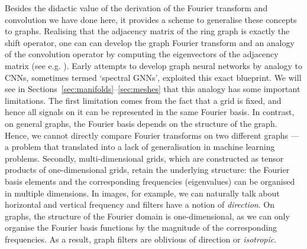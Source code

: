 Besides the didactic value of the derivation of the Fourier transform
and convolution we have done here, it provides a scheme to generalise these concepts to graphs. Realising that the adjacency matrix of the ring graph is exactly the shift operator, one can can develop the graph Fourier transform and an analogy of the convolution operator by computing the eigenvectors of the adjacency matrix (see e.g. \cite{sandryhaila2013discrete}).
%
Early attempts to develop graph neural networks by analogy to CNNs, sometimes termed `spectral GNNs', exploited this exact blueprint. 
%
We will see in %
Sections~\ref{sec:manifolds}--\ref{sec:meshes}
that this analogy has some important limitations. 
%
The first limitation comes from the fact that a grid is fixed, and hence all signals on it can be represented in the same Fourier basis. In contrast, on general graphs, the Fourier basis depends on the structure of the graph. Hence, we cannot directly compare Fourier transforms on two different graphs --- a problem that translated into a lack of generalisation in machine learning problems. 
%
Secondly, multi-dimensional grids, which are constructed as tensor products of one-dimensional grids, retain the underlying structure: the Fourier basis elements and the corresponding frequencies (eigenvalues) can be organised in multiple dimensions. In images, for example, we can naturally talk about horizontal and vertical frequency and filters have a notion of {\em direction}. On graphs, the structure of the Fourier domain is one-dimensional, as we can only organise the Fourier basis functions by the magnitude of the corresponding frequencies. As a result, graph filters are oblivious of direction or {\em isotropic}. 



